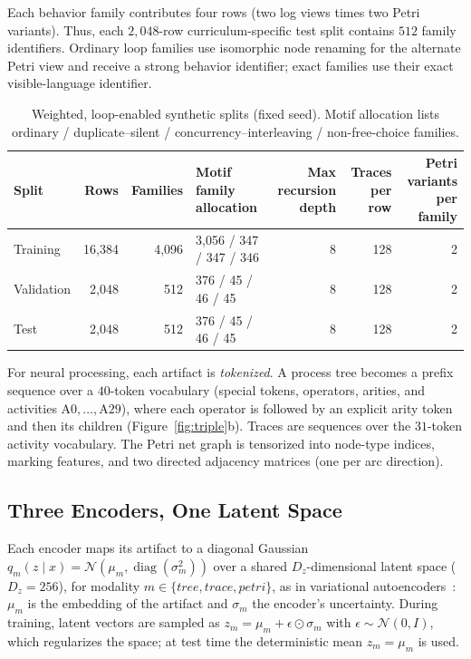 \documentclass[manuscript,screen,nonacm]{acmart}
\begin{document}
Each behavior family contributes four rows (two log views times two Petri variants). Thus, each $2{,}048$-row curriculum-specific test split contains $512$ family identifiers. Ordinary loop families use isomorphic node renaming for the alternate Petri view and receive a strong behavior identifier; exact families use their exact visible-language identifier.

\begin{table}
\caption{Weighted, loop-enabled synthetic splits (fixed seed). Motif allocation lists ordinary / duplicate--silent / concurrency--interleaving / non-free-choice families.}
\label{tab:dataset}
\small
\begin{tabular}{lrrlrrr}
\toprule
Split & Rows & Families & \makecell[l]{Motif family\\allocation} & \makecell[r]{Max recursion\\depth} & \makecell[r]{Traces per\\row} & \makecell[r]{Petri variants\\per family} \\
\midrule
Training   & 16{,}384 & 4{,}096 & 3{,}056 / 347 / 347 / 346 & 8 & 128 & 2 \\
Validation & 2{,}048  & 512     & 376 / 45 / 46 / 45        & 8 & 128 & 2 \\
Test       & 2{,}048  & 512     & 376 / 45 / 46 / 45        & 8 & 128 & 2 \\
\bottomrule
\end{tabular}
\end{table}

For neural processing, each artifact is \emph{tokenized}. A process tree becomes a prefix sequence over a $40$-token vocabulary (special tokens, operators, arities, and activities $\mathrm{A0}, \ldots, \mathrm{A29}$), where each operator is followed by an explicit arity token and then its children (Figure~\ref{fig:triple}b). Traces are sequences over the $31$-token activity vocabulary. The Petri net graph is tensorized into node-type indices, marking features, and two directed adjacency matrices (one per arc direction).

\subsection{Three Encoders, One Latent Space}
\label{sec:encoders}

Each encoder maps its artifact to a diagonal Gaussian $q_m(z \mid x) = \mathcal{N}(\mu_m, \operatorname{diag}(\sigma_m^2))$ over a shared $D_z$-dimensional latent space ($D_z = 256$), for modality $m \in \{\mathit{tree}, \mathit{trace}, \mathit{petri}\}$, as in variational autoencoders~\cite{KingmaWelling2014}: $\mu_m$ is the embedding of the artifact and $\sigma_m$ the encoder's uncertainty. During training, latent vectors are sampled as $z_m = \mu_m + \epsilon \odot \sigma_m$ with $\epsilon \sim \mathcal{N}(0, I)$, which regularizes the space; at test time the deterministic mean $z_m = \mu_m$ is used.
\end{document}
